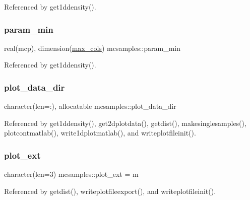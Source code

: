 Referenced by get1ddensity().

\mbox{\label{namespacemcsamples_a3c28ccd747cefdd44e51bee5809f7cf2}} 
\subsubsection{\texorpdfstring{param\+\_\+min}{param\_min}}
{\footnotesize\ttfamily real(mcp), dimension(\mbox{\hyperlink{namespacemcsamples_ae8386bad918d8af8d203683c01d5818c}{max\+\_\+cols}}) mcsamples\+::param\+\_\+min}



Referenced by get1ddensity().

\mbox{\label{namespacemcsamples_a77ab102d98a4253b3213f06db7371cf9}} 
\subsubsection{\texorpdfstring{plot\+\_\+data\+\_\+dir}{plot\_data\_dir}}
{\footnotesize\ttfamily character(len=\+:), allocatable mcsamples\+::plot\+\_\+data\+\_\+dir}



Referenced by get1ddensity(), get2dplotdata(), getdist(), makesinglesamples(), plotcontmatlab(), write1dplotmatlab(), and writeplotfileinit().

\mbox{\label{namespacemcsamples_ad18bd8eb2345c17a7aad3604eba3e3ad}} 
\subsubsection{\texorpdfstring{plot\+\_\+ext}{plot\_ext}}
{\footnotesize\ttfamily character(len=3) mcsamples\+::plot\+\_\+ext = \textquotesingle{}m\textquotesingle{}}



Referenced by getdist(), writeplotfileexport(), and writeplotfileinit().

\mbox{\label{namespacemcsamples_a68c0597751197a26086066ed961e47ef}} 
